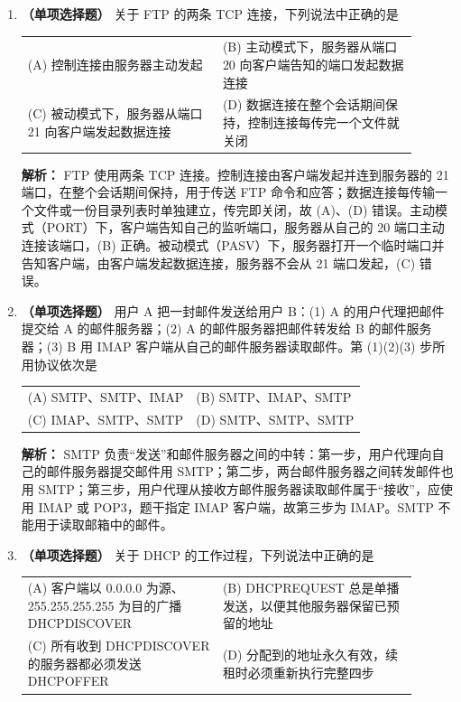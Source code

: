 \begin{enumerate}
\item \textbf{（单项选择题）} 关于 FTP 的两条 TCP 连接，下列说法中正确的是
\begin{center}
\begin{tabular}{>{\raggedright\arraybackslash}p{0.45\linewidth}>{\raggedright\arraybackslash}p{0.45\linewidth}}
(A) 控制连接由服务器主动发起 &
(B) 主动模式下，服务器从端口 20 向客户端告知的端口发起数据连接 \\[6pt]
(C) 被动模式下，服务器从端口 21 向客户端发起数据连接 &
(D) 数据连接在整个会话期间保持，控制连接每传完一个文件就关闭
\end{tabular}
\end{center}

\ifshowsolutions\par\noindent\textbf{解析：} FTP 使用两条 TCP 连接。控制连接由客户端发起并连到服务器的 21 端口，在整个会话期间保持，用于传送 FTP 命令和应答；数据连接每传输一个文件或一份目录列表时单独建立，传完即关闭，故 (A)、(D) 错误。主动模式（PORT）下，客户端告知自己的监听端口，服务器从自己的 20 端口主动连接该端口，(B) 正确。被动模式（PASV）下，服务器打开一个临时端口并告知客户端，由客户端发起数据连接，服务器不会从 21 端口发起，(C) 错误。\else \answerarea \fi

\item \textbf{（单项选择题）} 用户 A 把一封邮件发送给用户 B：(1) A 的用户代理把邮件提交给 A 的邮件服务器；(2) A 的邮件服务器把邮件转发给 B 的邮件服务器；(3) B 用 IMAP 客户端从自己的邮件服务器读取邮件。第 (1)(2)(3) 步所用协议依次是
\begin{center}
\begin{tabular}{ll}
(A) SMTP、SMTP、IMAP & (B) SMTP、IMAP、SMTP \\[6pt]
(C) IMAP、SMTP、SMTP & (D) SMTP、SMTP、SMTP
\end{tabular}
\end{center}

\ifshowsolutions\par\noindent\textbf{解析：} SMTP 负责“发送”和邮件服务器之间的中转：第一步，用户代理向自己的邮件服务器提交邮件用 SMTP；第二步，两台邮件服务器之间转发邮件也用 SMTP；第三步，用户代理从接收方邮件服务器读取邮件属于“接收”，应使用 IMAP 或 POP3，题干指定 IMAP 客户端，故第三步为 IMAP。SMTP 不能用于读取邮箱中的邮件。\else \answerarea \fi

\item \textbf{（单项选择题）} 关于 DHCP 的工作过程，下列说法中正确的是
\begin{center}
\begin{tabular}{>{\raggedright\arraybackslash}p{0.45\linewidth}>{\raggedright\arraybackslash}p{0.45\linewidth}}
(A) 客户端以 0.0.0.0 为源、255.255.255.255 为目的广播 DHCPDISCOVER &
(B) DHCPREQUEST 总是单播发送，以便其他服务器保留已预留的地址 \\[6pt]
(C) 所有收到 DHCPDISCOVER 的服务器都必须发送 DHCPOFFER &
(D) 分配到的地址永久有效，续租时必须重新执行完整四步
\end{tabular}
\end{center}


\end{enumerate}
